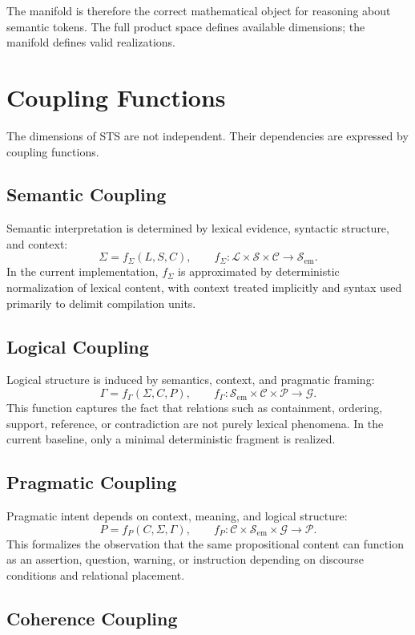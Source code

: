 \documentclass{article}
\newcommand{\STS}{{\normalfont\textsc{STS}}}
\newcommand{\Lex}{\mathcal{L}}
\newcommand{\Syn}{\mathcal{S}}
\newcommand{\Sem}{\mathcal{S}_{\mathrm{em}}}
\newcommand{\Rel}{\mathcal{G}}
\newcommand{\Ctx}{\mathcal{C}}
\newcommand{\Prag}{\mathcal{P}}
\begin{document}
The manifold is therefore the correct mathematical object for reasoning about semantic tokens. The full product space defines available dimensions; the manifold defines valid realizations.

\section{Coupling Functions}

The dimensions of \STS{} are not independent. Their dependencies are expressed by coupling functions.

\subsection*{Semantic Coupling}

Semantic interpretation is determined by lexical evidence, syntactic structure, and context:
\[
\Sigma = f_\Sigma(L,S,C),
\qquad
f_\Sigma : \Lex \times \Syn \times \Ctx \to \Sem.
\]
In the current implementation, \(f_\Sigma\) is approximated by deterministic normalization of lexical content, with context treated implicitly and syntax used primarily to delimit compilation units.

\subsection*{Logical Coupling}

Logical structure is induced by semantics, context, and pragmatic framing:
\[
\Gamma = f_\Gamma(\Sigma,C,P),
\qquad
f_\Gamma : \Sem \times \Ctx \times \Prag \to \Rel.
\]
This function captures the fact that relations such as containment, ordering, support, reference, or contradiction are not purely lexical phenomena. In the current baseline, only a minimal deterministic fragment is realized.

\subsection*{Pragmatic Coupling}

Pragmatic intent depends on context, meaning, and logical structure:
\[
P = f_P(C,\Sigma,\Gamma),
\qquad
f_P : \Ctx \times \Sem \times \Rel \to \Prag.
\]
This formalizes the observation that the same propositional content can function as an assertion, question, warning, or instruction depending on discourse conditions and relational placement.

\subsection*{Coherence Coupling}
\end{document}
